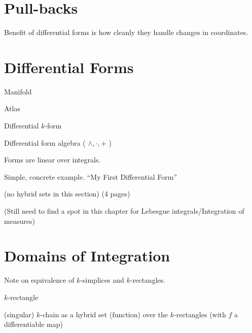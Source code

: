 \section{Pull-backs}

Benefit of differential forms is how cleanly they handle changes in coordinates.

\begin{definition}

\end{definition}


\section{Differential Forms}
\begin{definition}
Manifold
\end{definition}

\begin{definition}
Atlas
\end{definition}

\begin{definition}
Differential $k$-form
\end{definition}

Differential form algebra ( $\wedge, \cdot, +$ )

Forms are linear over integrals.

\begin{example}
Simple, concrete example. ``My First Differential Form''
\end{example}

(no hybrid sets in this section) (4 pages)

(Still need to find a spot in this chapter for Lebesgue integrals/Integration of measures)

\newpage \addtocounter{page}{3}

\section{Domains of Integration}

Note on equivalence of $k$-simplices and $k$-rectangles.

\begin{definition}
$k$-rectangle
\end{definition}

\begin{definition}
(singular) $k$-chain as a hybrid set (function) over the $k$-rectangles (with $f$ a differentiable map)
\end{definition}

